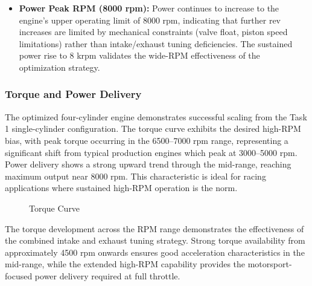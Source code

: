 \begin{itemize}
\item\textbf{Power Peak RPM (8000 rpm):} Power continues to increase to the engine's upper operating limit of 8000 rpm, indicating that further rev increases are limited by mechanical constraints (valve float, piston speed limitations) rather than intake/exhaust tuning deficiencies. The sustained power rise to 8 krpm validates the wide-RPM effectiveness of the optimization strategy.
\end{itemize}


\subsubsection{Torque and Power Delivery}

The optimized four-cylinder engine demonstrates successful scaling from the Task 1 single-cylinder configuration. The torque curve exhibits the desired high-RPM bias, with peak torque occurring in the 6500--7000 rpm range, representing a significant shift from typical production engines which peak at 3000--5000 rpm. Power delivery shows a strong upward trend through the mid-range, reaching maximum output near 8000 rpm. This characteristic is ideal for racing applications where sustained high-RPM operation is the norm.

\begin{figure}[H]
    \centering
    \begin{minipage}{\textwidth}
        \centering
        \caption{Torque Curve}
        \label{fig:task2_torque_detail}
    \end{minipage}
\end{figure}

The torque development across the RPM range demonstrates the effectiveness of the combined intake and exhaust tuning strategy. Strong torque availability from approximately 4500 rpm onwards ensures good acceleration characteristics in the mid-range, while the extended high-RPM capability provides the motorsport-focused power delivery required at full throttle. 
